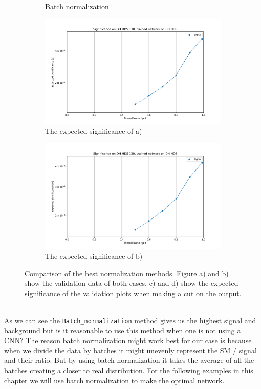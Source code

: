 \documentclass[12pt, a4paper]{book}
\begin{document}
\begin{figure}[!ht]
\begin{subfigure}[b]{0.49\textwidth}
      \caption{Batch normalization}
   \end{subfigure}
   \hfill
   \begin{subfigure}[b]{0.49\textwidth}
      \centering
      \includegraphics[width=1\textwidth]{Z_score/EXP_SIG.pdf}
      \caption{The expected significance of a)}
   \end{subfigure}
   \hfill
   \begin{subfigure}[b]{0.49\textwidth}
      \centering
      \includegraphics[width=1\textwidth]{BatchNorm/EXP_SIG.pdf}
      \caption{The expected significance of b)}
   \end{subfigure}
   \caption[Comparison of best NN normalization methods and expected significance calculation]{Comparison of the best normalization methods. Figure a) and b) show the validation data of both cases, c) and d) show the expected significance of the validation plots when making a cut on the output. }\label{fig:BestNormie}
\end{figure}
\\As we can see the \verb|Batch_normalization| method gives us the highest signal and background but is it reasonable to use this method when one is not using a CNN? The reason batch normalization might work best for our case is because when we divide the data by batches it might unevenly represent the SM / signal and 
their ratio. But by using batch normalization it takes the average of all the batches creating a closer to real distribution. For the following examples in this chapter we will use batch normalization to make the optimal network.\\ 
\clearpage
\end{document}
